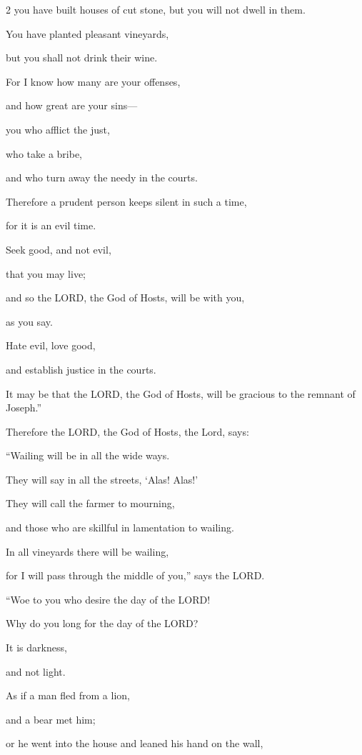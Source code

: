 \begin{multicols}{2}
	you have built houses of cut stone, but you will not dwell in them.
	
	You have planted pleasant vineyards,
	
	but you shall not drink their wine.
	
	\myverse{}For I know how many are your offenses,
	
	and how great are your sins—
	
	you who afflict the just,
	
	who take a bribe,
	
	and who turn away the needy in the courts.
	
	\myverse{}Therefore a prudent person keeps silent in such a time,
	
	for it is an evil time.
	
	\myverse{}Seek good, and not evil,
	
	that you may live;
	
	and so the LORD, the God of Hosts, will be with you,
	
	as you say.
	
	\myverse{}Hate evil, love good,
	
	and establish justice in the courts.
	
	It may be that the LORD, the God of Hosts, will be gracious to the remnant of
	Joseph.”
	
	\myverse{}Therefore the LORD, the God of Hosts, the Lord, says:
	
	“Wailing will be in all the wide ways.
	
	They will say in all the streets, ‘Alas! Alas!’
	
	They will call the farmer to mourning,
	
	and those who are skillful in lamentation to wailing.
	
	\myverse{}In all vineyards there will be wailing,
	
	for I will pass through the middle of you,” says the LORD.
	
	\myverse{}“Woe to you who desire the day of the LORD!
	
	Why do you long for the day of the LORD?
	
	It is darkness,
	
	and not light.
	
	\myverse{}As if a man fled from a lion,
	
	and a bear met him;
	
	or he went into the house and leaned his hand on the wall,
	

\end{multicols}
